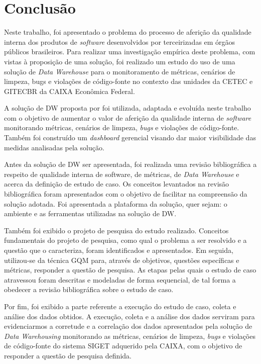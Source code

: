 \chapter{Conclusão}

Neste trabalho, foi apresentado o problema do processo de aferição da qualidade interna dos produtos de \textit{software} desenvolvidos por terceirizadas em órgãos públicos brasileiros. Para realizar uma investigação empírica deste problema, com vistas à proposição de uma solução, foi realizado um estudo do uso de uma solução de \textit{Data Warehouse} para o monitoramento de métricas, cenários de limpeza, bugs e violações de código-fonte no contexto das unidades da  CETEC e GITECBR da CAIXA Econômica Federal.

A solução de DW proposta por  foi utilizada, adaptada e evoluída neste trabalho com o objetivo de aumentar o valor de aferição da qualidade interna de \textit{software} monitorando métricas, cenários de limpeza, \textit{bugs} e violações de código-fonte. Também foi construído um \textit{dashboard} gerencial visando dar maior visibilidade das medidas analisadas pela solução.

Antes da solução de DW ser apresentada, foi realizada uma revisão bibliográfica a respeito de qualidade interna de software, de métricas, de \textit{Data Warehouse} e acerca da definição de estudo de caso. Os conceitos levantados na revisão bibliográfica foram apresentados com o objetivo de facilitar na compreensão da solução adotada. Foi apresentada a plataforma da solução, quer sejam: o ambiente e as ferramentas utilizadas na solução de DW. 

Também foi exibido o projeto de pesquisa do estudo realizado. Conceitos fundamentais do projeto de pesquisa, como qual o problema a ser resolvido e a questão que o caracteriza, foram identificados e apresentados. Em seguida, utilizou-se da  técnica GQM para, através de objetivos, questões específicas e métricas, responder a questão de pesquisa. As etapas pelas quais o estudo de caso atravessou foram descritas e modeladas de forma sequencial, de tal forma a obedecer a revisão bibliográfica sobre o estudo de caso.

Por fim, foi exibido a parte referente a execução do estudo de caso, coleta e análise dos dados obtidos. A execução, coleta e a análise dos dados serviram para evidenciarmos a corretude e a correlação dos dados apresentados pela solução de \textit{Data Warehousing} monitorando as métricas, cenários de limpeza, \textit{bugs} e violações de código-fonte do sistema SIGET adquerido pela CAIXA, com o objetivo de responder a questão de pesquisa definida.

